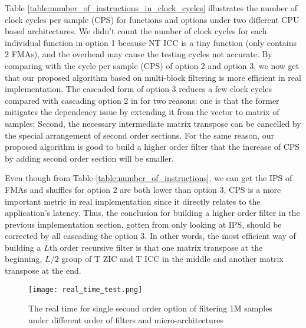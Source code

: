 Table \ref{table:number_of_instructions_in_clock_cycles} illustrates the number of clock cycles per sample (CPS) for functions and options
under two different CPU based architectures. 
We didn't count the number of clock cycles for each individual function in option 1 
because NT ICC is a tiny function (only contains 2 FMAs),
and the overhead may cause the testing cycles not accurate.
By comparing with the cycle per sample (CPS) of option 2 and option 3, we now get that
our proposed algorithm based on multi-block filtering is more efficient in real implementation.
The cascaded form of option 3 reduces a few clock cycles compared with cascading option 2 in \cite{Jaewoo_09}
for two reasons: one is that the former mitigates the dependency issue
by extending it from the vector to matrix of samples; Second, 
the necessary intermediate matrix transpose can be cancelled by the special arrangement of second order sections.  
For the same reason, our proposed algorithm is good to build a higher order filter that 
the increase of CPS by adding second order section will be smaller.

Even though from Table \ref{table:number_of_instructions}, we can get the IPS of FMAs and shuffles for option 2 are both lower than
option 3, CPS is a more important metric in real implementation since it directly relates to the application's latency.
Thus, the conclusion for building a higher order filter in the previous implementation section, gotten from only looking at IPS,
should be corrected by all cascading the option 3. In other words, 
the most efficient way of building 
a $L$th order recursive filter is that one matrix transpose at the beginning, $L/2$ group of T ZIC and T ICC in the middle and another matrix transpose at the end.

\begin{figure}[t]
    \centerline{\texttt{[image: real\_time\_test.png]}}
    \caption{The real time for single second order option of filtering 1M samples under different order of filters and micro-architectures}
    \label{fig:Real_time_test}
  \end{figure}

